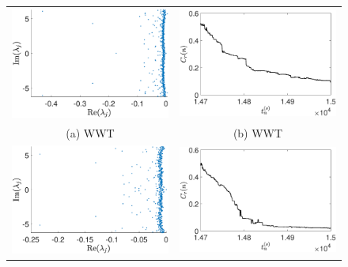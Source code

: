 \documentclass[a4paper,11pt]{article}
\begin{document}
\begin{figure}[!ht]
\centering
\begin{tabular}{cc}
\includegraphics[width=.525\textwidth]{full_spec_wwt_K_256_Lx_128_tf_1_pt5e4} &\hspace{-25pt} \includegraphics[width=.525\textwidth]{cratio_wwt_K_256_Lx_128_tf_1pt5e4}\\
(a) WWT & (b) WWT\\
\includegraphics[width=.525\textwidth]{full_spec_lf_K_256_Lx_128_tf_1_pt5e4} &\hspace{-25pt} \includegraphics[width=.525\textwidth]{cratio_lfforce_K_256_Lx_128_tf_1pt5e4}\\

\end{tabular}
\end{figure}
\end{document}
